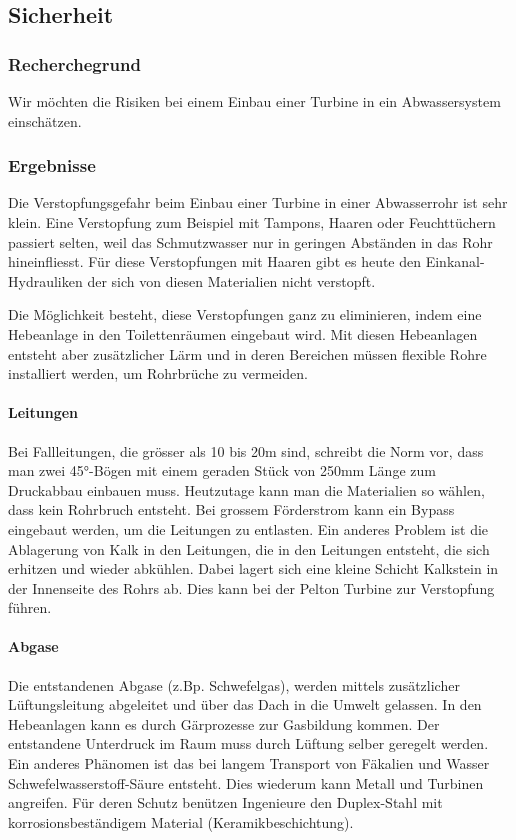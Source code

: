 \subsection{Sicherheit}


\subsubsection{Recherchegrund}
Wir möchten die Risiken bei einem Einbau einer Turbine in ein Abwassersystem einschätzen.

\subsubsection{Ergebnisse}
Die Verstopfungsgefahr beim Einbau einer Turbine in einer Abwasserrohr ist sehr klein. 
Eine Verstopfung zum Beispiel mit Tampons, Haaren oder Feuchttüchern passiert selten, weil das Schmutzwasser nur in geringen Abständen in das Rohr hineinfliesst. 
Für diese Verstopfungen mit Haaren gibt es heute den Einkanal-Hydrauliken der sich von diesen Materialien nicht verstopft.\cite{Homa-Pumpen}

Die Möglichkeit besteht, diese Verstopfungen ganz zu eliminieren, indem eine Hebeanlage in den Toilettenräumen eingebaut wird. Mit diesen Hebeanlagen entsteht aber zusätzlicher Lärm und in deren Bereichen müssen flexible Rohre installiert werden, um Rohrbrüche zu vermeiden. \cite{Hebeanlagen,Tipp zum Bau}
\paragraph{Leitungen}
Bei Fallleitungen, die grösser als 10 bis 20\si{m} sind, schreibt die Norm vor, dass man zwei 45°-Bögen mit einem geraden Stück von 250\si{mm} Länge zum Druckabbau einbauen muss. Heutzutage kann man die Materialien so wählen, dass kein Rohrbruch entsteht. Bei grossem Förderstrom kann ein Bypass eingebaut werden, um die Leitungen zu entlasten. 
Ein anderes Problem ist die Ablagerung von Kalk in den Leitungen, die in den Leitungen entsteht, die sich erhitzen und wieder abkühlen. Dabei lagert sich eine kleine Schicht Kalkstein in der Innenseite des Rohrs ab. Dies kann bei der Pelton Turbine zur Verstopfung führen. \cite{BauNetz Media,Mediagon,Kreiselpumpenlexikon}
\paragraph{Abgase}
Die entstandenen Abgase (z.Bp. Schwefelgas), werden mittels zusätzlicher Lüftungsleitung abgeleitet und über das Dach in die Umwelt gelassen. In den Hebeanlagen kann es durch Gärprozesse zur Gasbildung kommen. Der entstandene Unterdruck im Raum muss durch Lüftung selber geregelt werden. 
Ein anderes Phänomen ist das bei langem Transport von Fäkalien und Wasser Schwefelwasserstoff-Säure entsteht. Dies wiederum kann Metall und Turbinen angreifen. Für deren Schutz benützen Ingenieure den Duplex-Stahl mit korrosionsbeständigem Material (Keramikbeschichtung).\cite{Water & Wastewater}



